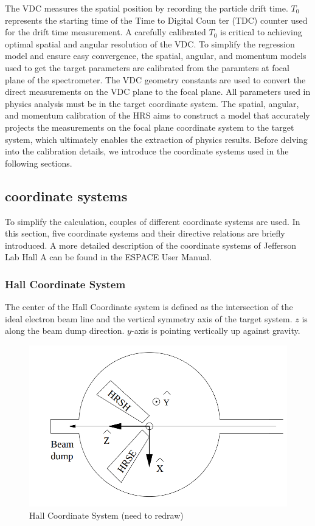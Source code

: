 The VDC measures the spatial position by recording the particle drift time. $T_0$ represents the starting time of the Time to Digital Coun ter (TDC) counter used for the drift time measurement. A carefully calibrated $T_0$ is critical to achieving optimal spatial and angular resolution of the VDC. To simplify the regression model and ensure easy convergence, the spatial, angular, and momentum models used to get the target parameters are calibrated from the paramters at focal plane of the spectrometer. The VDC geometry constants are used to convert the direct measurements on the VDC plane to the focal plane. All parameters used in physics analysis must be in the target coordinate system. The spatial, angular, and momentum calibration of the HRS aims to construct a model that accurately projects the measurements on the focal plane coordinate system to the target system, which ultimately enables the extraction of physics results. Before delving into the calibration details, we introduce the coordinate systems used in the following sections.

\subsection{coordinate systems}


To simplify the calculation, couples of different coordinate systems are used. In this section, five coordinate systems and their directive relations are briefly introduced. A more detailed description of the coordinate systems of Jefferson Lab Hall A can be found in the ESPACE User Manual\cite{espace2002manual}.  

\subsubsection{Hall Coordinate System}
The center of the Hall Coordinate system is defined as the intersection of the ideal  electron beam line and the vertical symmetry axis of the target system. $z$ is along the beam dump direction. $y$-axis is pointing vertically up against gravity.

\begin{figure}[!h]
    \centering
    \includegraphics[scale = 0.40]{images/chap4/hall_coordinate_system.png}
    \caption{Hall Coordinate System (need to redraw)}
    \label{fig:hall_coordinate_system}
\end{figure}

